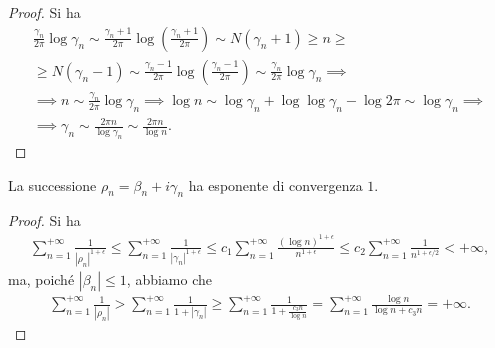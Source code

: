 \begin{proof}
  Si ha
  \begin{gather*}
    \frac{\gamma_n}{2\pi}\log{\gamma_n} \sim \frac{\gamma_n+1}{2\pi}\log\left(\frac{\gamma_n+1}{2\pi}\right) \sim N(\gamma_n+1) \ge n \ge \\
    \ge N(\gamma_n-1) \sim \frac{\gamma_n-1}{2\pi}\log\left(\frac{\gamma_n-1}{2\pi}\right) \sim \frac{\gamma_n}{2\pi}\log{\gamma_n} \implies \\
    \implies n \sim \frac{\gamma_n}{2\pi}\log{\gamma_n} \implies \log{n} \sim \log{\gamma_n}+\log\log{\gamma_n}-\log{2\pi} \sim \log{\gamma_n} \implies \\
    \implies \gamma_n \sim \frac{2\pi n}{\log{\gamma_n}} \sim \frac{2\pi n}{\log{n}}.
  \end{gather*}
\end{proof}

\begin{cor}
  La successione $\rho_n=\beta_n+i\gamma_n$ ha esponente di convergenza $1$.
\end{cor}

\begin{proof}
  Si ha
  \begin{gather*}
    \sum_{n=1}^{+\infty} \frac{1}{|\rho_n|^{1+\epsilon}} \le \sum_{n=1}^{+\infty} \frac{1}{|\gamma_n|^{1+\epsilon}} \le c_1 \sum_{n=1}^{+\infty} \frac{(\log{n})^{1+\epsilon}}{n^{1+\epsilon}} \le c_2 \sum_{n=1}^{+\infty} \frac{1}{n^{1+\epsilon/2}}<+\infty,
  \end{gather*}
  ma, poiché $|\beta_n| \le 1$, abbiamo che
  \begin{gather*}
    \sum_{n=1}^{+\infty} \frac{1}{|\rho_n|}>\sum_{n=1}^{+\infty} \frac{1}{1+|\gamma_n|} \ge \sum_{n=1}^{+\infty} \frac{1}{1+\frac{c_3n}{\log{n}}}=\sum_{n=1}^{+\infty} \frac{\log{n}}{\log{n}+c_3n}=+\infty.
  \end{gather*}
\end{proof}
